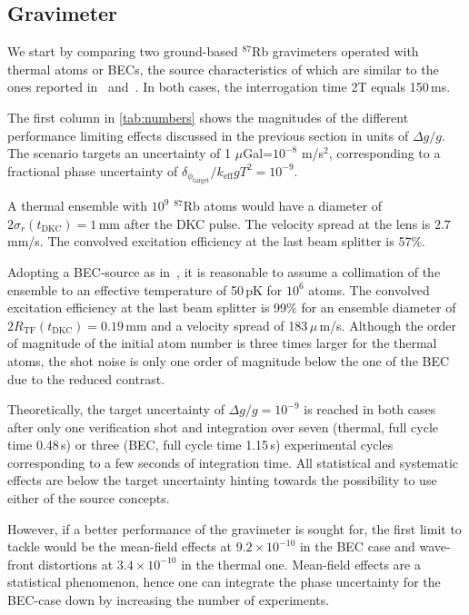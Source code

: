 \subsection{Gravimeter}
We start by comparing two ground-based $^{87}$Rb gravimeters operated with thermal atoms or BECs, the source characteristics of which are similar to the ones reported in~\cite{LouchetChauvet2011} and~\cite{Albers2020,Rudolph2015}. In both cases, the interrogation time 2T equals 150\,ms.

The first column in \autoref{tab:numbers} shows the magnitudes of the different performance limiting effects discussed in the previous section in units of $\Delta g/g$. The scenario targets an uncertainty of 1 $\mu$Gal=$10^{-8}$ m/s$^2$, corresponding to a fractional phase uncertainty of $\delta_{\phi_\text{target}}/k_\text{eff}gT^2=10^{-9}$. 

A thermal ensemble with $10^9$ $^{87}$Rb atoms would have a diameter of $2\sigma_r(t_\text{DKC})=1$\,mm after the DKC pulse. The velocity spread at the lens is $2.7$\,mm/s. The convolved excitation efficiency at the last beam splitter is 57\%. 

Adopting a BEC-source as in~\cite{Rudolph2015}, it is reasonable to assume a collimation of the ensemble to an effective temperature of 50\,pK for $10^6$ atoms. The convolved excitation efficiency at the last beam splitter is 99\% for an ensemble diameter of $2R_\text{TF}(t_\text{DKC})=0.19$\,mm and a velocity spread of 183\,$\mu$\,m/s. Although the order of magnitude of the initial atom number is three times larger for the thermal atoms, the shot noise is only one order of magnitude below the one of the BEC due to the reduced contrast.

Theoretically, the target uncertainty of $\Delta g/g=10^{-9}$ is reached in both cases after only one verification shot and integration over seven (thermal, full cycle time 0.48\,s) or three (BEC, full cycle time 1.15\,s) experimental cycles corresponding to a few seconds of integration time. 
All statistical and systematic effects are below the target uncertainty hinting towards the possibility to use either of the source concepts.

However, if a better performance of the gravimeter is sought for, the first limit to tackle would be the mean-field effects at $9.2\times10^{-10}$ in the BEC case and wave-front distortions at $3.4\times10^{-10}$ in the thermal one. 
Mean-field effects are a statistical phenomenon, hence one can integrate the phase uncertainty for the BEC-case down by increasing the number of experiments. 

